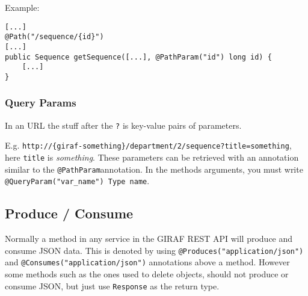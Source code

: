 \newpage
\noindent
Example:
\begin{lstlisting}
[...]
@Path("/sequence/{id}")
[...]
public Sequence getSequence([...], @PathParam("id") long id) {
    [...]
}
\end{lstlisting}

\subsubsection{Query Params}
In an URL the stuff after the \texttt{?} is key-value pairs of parameters.

E.g. \texttt{http://\{giraf-something\}/department/2/sequence?title=something}, here \texttt{title} is \textit{something}.
These parameters can be retrieved with an annotation similar to the \texttt{@PathParam}annotation.
In the methods arguments, you must write \texttt{@QueryParam("var\_name") Type name}.


\subsection{Produce / Consume}
Normally a method in any service in the GIRAF REST API will produce and consume JSON data. This is denoted by using \texttt{@Produces("application/json")} and \texttt{@Consumes("application/json")} annotations above a method.
However some methods such as the ones used to delete objects, should not produce or consume JSON, but just use \texttt{Response} as the return type.
